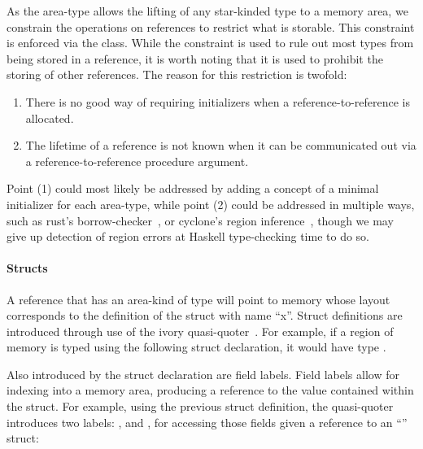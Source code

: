 As the  area-type allows the lifting of any star-kinded type to a
memory area, we constrain the operations on references to restrict what is
storable.  This constraint is enforced via the  class.  While the
 constraint is used to rule out most types from being stored in a
reference, it is worth noting that it is used to prohibit the storing of other
references.  The reason for this restriction is twofold:
\begin{enumerate}
\item   There is no good
way of requiring initializers when a reference-to-reference is allocated.
\item The lifetime of a reference is not known when it can be
communicated out via a reference-to-reference procedure argument.
\end{enumerate}

Point (1) could most likely be addressed by adding a concept of a minimal
initializer for each area-type, while point (2) could be addressed in multiple
ways, such as rust's borrow-checker~\cite{rust}, or cyclone's region
inference~\cite{cyclone}, though we may give up detection of region errors at
Haskell type-checking time to do so.

\paragraph{Structs} A reference that has an area-kind of type 
will point to memory whose layout corresponds to the definition of the struct
with name ``x''.  Struct definitions are introduced through use of the ivory
quasi-quoter~\cite{quoted}.  For example, if a region of memory is typed using
the following struct declaration, it would have type .

\begin{code}
\end{code}

Also introduced by the struct declaration are field labels.  Field labels allow
for indexing into a memory area, producing a reference to the value contained
within the struct.  For example, using the previous struct definition, the
quasi-quoter introduces two labels: , and , for accessing
those fields given a reference to an ``'' struct:


